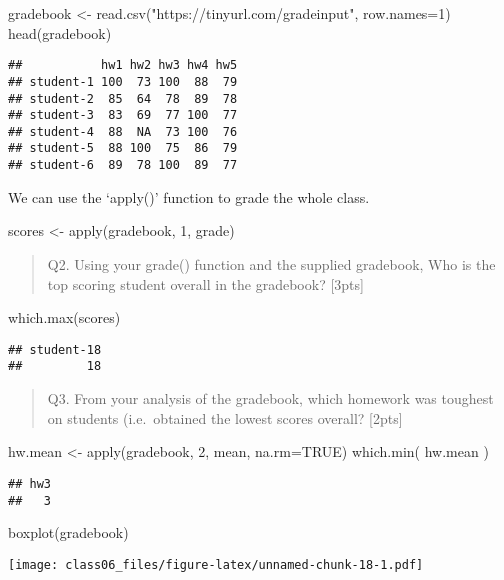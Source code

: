 \documentclass[
]{article}
\newenvironment{Shaded}{\begin{snugshade}}{\end{snugshade}}
\newcommand{\AttributeTok}[1]{\textcolor[rgb]{0.77,0.63,0.00}{#1}}
\newcommand{\ConstantTok}[1]{\textcolor[rgb]{0.00,0.00,0.00}{#1}}
\newcommand{\DecValTok}[1]{\textcolor[rgb]{0.00,0.00,0.81}{#1}}
\newcommand{\FunctionTok}[1]{\textcolor[rgb]{0.00,0.00,0.00}{#1}}
\newcommand{\NormalTok}[1]{#1}
\newcommand{\OtherTok}[1]{\textcolor[rgb]{0.56,0.35,0.01}{#1}}
\newcommand{\StringTok}[1]{\textcolor[rgb]{0.31,0.60,0.02}{#1}}
\begin{document}
\begin{Shaded}
\begin{Highlighting}[]
\NormalTok{gradebook }\OtherTok{\textless{}{-}} \FunctionTok{read.csv}\NormalTok{(}\StringTok{"https://tinyurl.com/gradeinput"}\NormalTok{, }\AttributeTok{row.names=}\DecValTok{1}\NormalTok{)}
\FunctionTok{head}\NormalTok{(gradebook)}
\end{Highlighting}
\end{Shaded}

\begin{verbatim}
##           hw1 hw2 hw3 hw4 hw5
## student-1 100  73 100  88  79
## student-2  85  64  78  89  78
## student-3  83  69  77 100  77
## student-4  88  NA  73 100  76
## student-5  88 100  75  86  79
## student-6  89  78 100  89  77
\end{verbatim}

We can use the `apply()' function to grade the whole class.

\begin{Shaded}
\begin{Highlighting}[]
\NormalTok{scores }\OtherTok{\textless{}{-}} \FunctionTok{apply}\NormalTok{(gradebook, }\DecValTok{1}\NormalTok{, grade)}
\end{Highlighting}
\end{Shaded}

\begin{quote}
Q2. Using your grade() function and the supplied gradebook, Who is the
top scoring student overall in the gradebook? {[}3pts{]}
\end{quote}

\begin{Shaded}
\begin{Highlighting}[]
\FunctionTok{which.max}\NormalTok{(scores)}
\end{Highlighting}
\end{Shaded}

\begin{verbatim}
## student-18 
##         18
\end{verbatim}

\begin{quote}
Q3. From your analysis of the gradebook, which homework was toughest on
students (i.e.~obtained the lowest scores overall? {[}2pts{]}
\end{quote}

\begin{Shaded}
\begin{Highlighting}[]
\NormalTok{hw.mean }\OtherTok{\textless{}{-}} \FunctionTok{apply}\NormalTok{(gradebook, }\DecValTok{2}\NormalTok{, mean, }\AttributeTok{na.rm=}\ConstantTok{TRUE}\NormalTok{)}
\FunctionTok{which.min}\NormalTok{( hw.mean )}
\end{Highlighting}
\end{Shaded}

\begin{verbatim}
## hw3 
##   3
\end{verbatim}

\begin{Shaded}
\begin{Highlighting}[]
\FunctionTok{boxplot}\NormalTok{(gradebook)}
\end{Highlighting}
\end{Shaded}

\texttt{[image: class06\_files/figure-latex/unnamed-chunk-18-1.pdf]}
\end{document}
